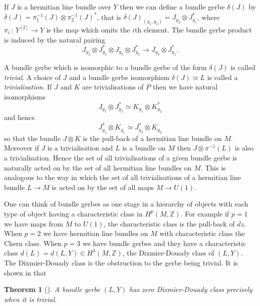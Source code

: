 \documentclass[a4paper,reqno]{amsart}
\theoremstyle{plain}
\newtheorem{theorem}{Theorem}[section]
\theoremstyle{definition}
\theoremstyle{remark}
\numberwithin{equation}{section}
\numberwithin{figure}{section}
\newcommand{\ZZ}{{\mathbb Z}}
\newcommand{\<}{\langle}
\renewcommand{\>}{\rangle}
\begin{document}
If $J$ is a hermitian line bundle over $Y$ then we can define a
bundle gerbe $\delta(J)$ by $\delta(J) = {\pi_1^{-1}(J)}\otimes
\pi_2^{-1}(J)^*$, that is $\delta(J)_{(y_1, y_2)} = J_{y_2} \otimes J_{y_1}^*$,
where $\pi_i\,:\,Y^{[2]} \to Y$ is the map which omits the $i$th element.
The bundle gerbe product
is induced by the natural pairing
$$
J_{y_2}\otimes J_{y_1}^*\otimes J_{y_3}\otimes J_{y_2}^* \to
J_{y_3}\otimes J_{y_1}^*.$$

A bundle gerbe which is isomorphic
to a  bundle gerbe of the form $\delta(J)$ is  called {\em trivial}.
A choice of $J$ and  a bundle gerbe  isomorphism $\delta(J) \simeq L$ is called
a {\em trivialisation}.  If $J$ and $K$ are trivialisations
of $P$ then we have natural isomorphisms
$$
J_{y_1}\otimes J_{y_2}^* \simeq K_{y_1}\otimes K_{y_2}^*
$$
and hence
$$
J_{y_1}^*\otimes K_{y_1} \simeq J_{y_2}^*\otimes K_{y_2}
$$
so that the bundle $J\otimes K$ is the pull-back of a hermitian line
bundle on $M$. Moreover if $J$ is a trivialisation and
$L$ is a bundle on $M$ then $J \otimes \pi^{-1}(L)$ is
also a trivialisation.  Hence the set of all trivialisations of
a given bundle gerbe is naturally acted on by the set of all
hermitian line bundles on $M$.  This is analogous to the way in which the
set of all trivialisations of a hermitian line bundle $ L\to M$ is acted
on by the set of all maps $M \to U(1)$.

One can think of
bundle gerbes as one stage in a hierarchy of objects with
each type of object having a characteristic class in $H^p(M, \ZZ)$.
For example if $p=1$ we have maps from $M$ to $U(1)$, the characteristic
class is the pull-back of $dz$.  When $p=2$  we have hermitian line
bundles on $M$ with
characteristic class the Chern class. When $p=3$ we have bundle gerbes and
they have a characteristic class $d(L) = d(L, Y) \in H^3(M, \ZZ)$,
the Dixmier-Douady class of $(L, Y)$.  The Dixmier-Douady class is the
obstruction to the gerbe being trivial.
It is shown in \cite{Mur} that
\begin{theorem}[\cite{Mur}]
\label{th:trivial}
A bundle gerbe $(L, Y)$ has zero Dixmier-Douady class
precisely when it is trivial.
\end{theorem}
\end{document}
